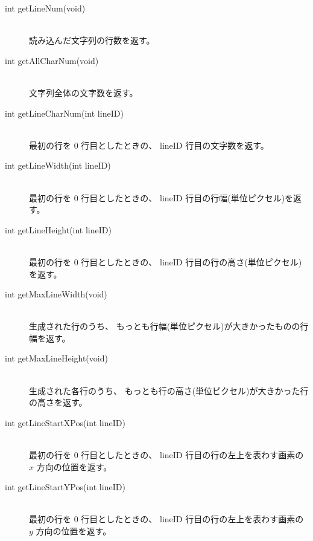 \begin{description}
\item[int getLineNum(void)] ~ \\
	読み込んだ文字列の行数を返す。\\

\item[int getAllCharNum(void)] ~ \\
	文字列全体の文字数を返す。\\

\item[int getLineCharNum(int lineID)] ~ \\
	最初の行を 0 行目としたときの、
	lineID 行目の文字数を返す。\\

\item[int getLineWidth(int lineID)] ~ \\
	最初の行を 0 行目としたときの、
	lineID 行目の行幅(単位ピクセル)を返す。\\

\item[int getLineHeight(int lineID)] ~ \\
	最初の行を 0 行目としたときの、
	lineID 行目の行の高さ(単位ピクセル)を返す。\\

\item[int getMaxLineWidth(void)] ~ \\
	生成された行のうち、
	もっとも行幅(単位ピクセル)が大きかったものの行幅を返す。\\

\item[int getMaxLineHeight(void)] ~ \\
	生成された各行のうち、
	もっとも行の高さ(単位ピクセル)が大きかった行の高さを返す。\\

\item[int getLineStartXPos(int lineID)] ~ \\
	最初の行を 0 行目としたときの、
	lineID 行目の行の左上を表わす画素の \(x\) 方向の位置を返す。\\

\item[int getLineStartYPos(int lineID)] ~ \\
	最初の行を 0 行目としたときの、
	lineID 行目の行の左上を表わす画素の \(y\) 方向の位置を返す。
\end{description}

